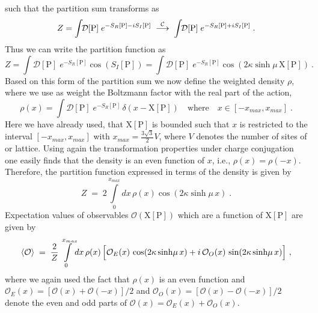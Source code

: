 \documentclass[a4paper,11pt]{article}
\begin{document}
%
such that the partition sum transforms as
%
\begin{equation}
\label{Ztrafo}
Z  = \int \!\! \mathcal{D}[\mathrm{P}] \; e^{-S_{R}[\mathrm{P}] - i S_I[\mathrm{P}] } \; 
\overset{{\cal C}}{\longrightarrow} \; \int \!\! \mathcal{D}[\mathrm{P}] \; e^{-S_{R}[\mathrm{P}] + i S_I[\mathrm{P}] } \; .
\end{equation}
%
Thus we can write the partition function as
\begin{equation}
Z  = \int \!\! \mathcal{D}[\mathrm{P}] \; e^{-S_{R}[\mathrm{P}] }  \cos( S_I[\mathrm{P}] ) = 
\int \!\! \mathcal{D}[\mathrm{P}] \; e^{-S_{R}[\mathrm{P}] }  \cos( 2 \kappa \sinh \! \mu \, \mathrm{X[P]} ) ~.
\end{equation}
%
Based on this form of the partition sum we now define the weighted density $\rho$, 
where we use as weight the Boltzmann factor with the real part of the action,
%
\begin{equation}
\rho (x) =  \int \!\! \mathcal{D} [\mathrm{P}] \; e^{-S_{R}[ \mathrm{P} ]} \, \delta(x-\mathrm{X[P]} ) 
\quad \text{where} \quad x \in [-x_{max},x_{max}] \; .
\label{rhodef}
\end{equation}
%
Here we have already used, that $\mathrm{X[P]}$ is bounded such that $x$ is restricted to the interval 
$[-x_{max},x_{max}]$ with $x_{max} = \frac{3\sqrt{3}}{2} V$, where $V$ denotes the number of sites of or lattice. 
Using again the transformation 
properties under charge conjugation one easily finds that the density is an even function of $x$, i.e., $\rho(x)=\rho(-x)$. 
Therefore, the partition function expressed in terms of the density is given by
%
\begin{equation}
\label{zrho}
Z \; = \; 2 \int\limits_{0}^{x_{max}} \!\! dx \, \rho(x) \cos( 2 \kappa \sinh \! \mu \, x)  \; .
\end{equation}
%
Expectation values of observables $\mathcal{O}(\mathrm{X[P]})$ which are a function of $\mathrm{X[P]}$ are given by
\begin{equation}
\label{vevrho}
\langle \mathcal{O} \rangle \; = \; \frac{2}{Z} \int\limits_{0}^{x_{max}} \!\! dx \, \rho(x) \, \Bigl[ \mathcal{O}_{E}(x) \, 
\cos( 2 \kappa \sinh\! \mu \, x) + i \, \mathcal{O}_{O}(x) \, \sin( 2 \kappa \sinh \! \mu \, x) \Bigr] ~,
\end{equation}
where we again used the fact that $\rho(x)$ is an even function and
$\mathcal{O}_{E}(x) = [\mathcal{O}(x) + \mathcal{O}(-x)]/2$ and 
$\mathcal{O}_{O}(x) = [\mathcal{O}(x) -\mathcal{O}(-x)]/2$ 
denote the even and odd parts of $\mathcal{O}(x) = \mathcal{O}_{E}(x) +\mathcal{O}_{O}(x) $.
\end{document}
